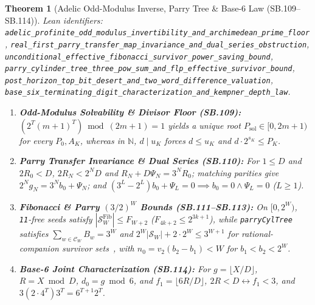 \documentclass[11pt]{article}
\newtheorem{theorem}{Theorem}[section]
\begin{document}
\begin{theorem}[Adelic Odd-Modulus Inverse, Parry Tree \& Base-6 Law (SB.109--SB.114)]
\emph{Lean identifiers:} \nolinkurl{adelic_profinite_odd_modulus_invertibility_and_archimedean_prime_floor}, \nolinkurl{real_first_parry_transfer_map_invariance_and_dual_series_obstruction}, \nolinkurl{unconditional_effective_fibonacci_survivor_power_saving_bound}, \nolinkurl{parry_cylinder_tree_three_pow_sum_and_flp_effective_survivor_bound}, \nolinkurl{post_horizon_top_bit_desert_and_two_word_difference_valuation}, \nolinkurl{base_six_terminating_digit_characterization_and_kempner_depth_law}.
\begin{enumerate}
  \item \textbf{Odd-Modulus Solvability \& Divisor Floor (SB.109):} $(2^T (m+1)^T) \bmod (2m+1) = 1$ yields a unique root $P_{\text{sol}} \in [0, 2m+1)$ for every $P_0, A_K$, whereas in $\mathbb{N}$, $d \mid u_K$ forces $d \le u_K$ and $d \cdot 2^{s_K} \le P_K$.
  \item \textbf{Parry Transfer Invariance \& Dual Series (SB.110):} For $1 \le D$ and $2 R_0 < D$, $2 R_N < 2^N D$ and $R_N + D \Psi_N = 3^N R_0$; matching parities give $2^N g_N = 3^N b_0 + \Psi_N$; and $(3^L - 2^L) b_0 + \Psi_L = 0 \implies b_0 = 0 \wedge \Psi_L = 0$ ($L \ge 1$).
  \item \textbf{Fibonacci \& Parry $(3/2)^W$ Bounds (SB.111--SB.113):} On $[0, 2^W)$, \texttt{11}-free seeds satisfy $|\mathcal{S}^{\text{Fib}}_W| \le F_{W+2}$ ($F_{4k+2} \le 2^{3k+1}$), while \nolinkurl{parryCylTree} satisfies $\sum_{w \in \mathcal{C}_W} B_w = 3^W$ and $2^W |\mathcal{S}_W| + 2 \cdot 2^W \le 3^{W+1}$ for rational-companion survivor sets~\cite{Flatto1992,FLP1995}, with $n_0 = v_2(b_2 - b_1) < W$ for $b_1 < b_2 < 2^W$.
  \item \textbf{Base-6 Joint Characterization (SB.114):} For $g = \lfloor X/D \rfloor$, $R = X \bmod D$, $d_0 = g \bmod 6$, and $f_1 = \lfloor 6 R / D \rfloor$, $2 R < D \leftrightarrow f_1 < 3$, and $3(2 \cdot 4^T) 3^T = 6^{T+1} 2^T$.
\end{enumerate}
\end{theorem}
\end{document}
